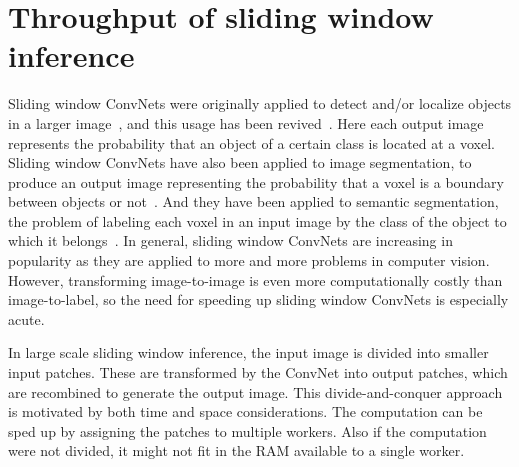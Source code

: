 \documentclass[conference]{./IEEEtran}
\begin{document}


\section{Throughput of sliding window inference}
  Sliding window ConvNets were originally applied to detect and/or
  localize objects in a larger image~\cite{matan1991multi}, and this
  usage has been revived~\cite{sermanet2013overfeat}. Here each output
  image represents the probability that an object of a certain class
  is located at a voxel.  Sliding window ConvNets have also been
  applied to image segmentation, to produce an output image
  representing the probability that a voxel is a boundary between
  objects or not~\cite{jain2007supervised}.  And they have been
  applied to semantic segmentation, the problem of labeling each voxel
  in an input image by the class of the object to which it
  belongs~\cite{ning2005toward}.  In general, sliding window ConvNets
  are increasing in popularity as they are applied to more and more
  problems in computer vision.  However, transforming image-to-image
  is even more computationally costly than image-to-label, so the need
  for speeding up sliding window ConvNets is especially acute.

  In large scale sliding window inference, the input image is divided
  into smaller input patches. These are transformed by the ConvNet
  into output patches, which are recombined to generate the output
  image.  This divide-and-conquer approach is motivated by both time
  and space considerations.  The computation can be sped up by
  assigning the patches to multiple workers.  Also if the computation
  were not divided, it might not fit in the RAM available to a single
  worker.
\end{document}
